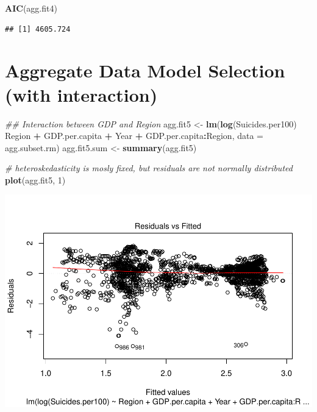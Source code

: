 \documentclass[11pt,]{article}
\newenvironment{Shaded}{\begin{snugshade}}{\end{snugshade}}
\newcommand{\CommentTok}[1]{\textcolor[rgb]{0.56,0.35,0.01}{\textit{#1}}}
\newcommand{\DataTypeTok}[1]{\textcolor[rgb]{0.13,0.29,0.53}{#1}}
\newcommand{\DecValTok}[1]{\textcolor[rgb]{0.00,0.00,0.81}{#1}}
\newcommand{\KeywordTok}[1]{\textcolor[rgb]{0.13,0.29,0.53}{\textbf{#1}}}
\newcommand{\NormalTok}[1]{#1}
\newcommand{\OperatorTok}[1]{\textcolor[rgb]{0.81,0.36,0.00}{\textbf{#1}}}
\newcommand{\StringTok}[1]{\textcolor[rgb]{0.31,0.60,0.02}{#1}}
\begin{document}
\begin{Shaded}
\begin{Highlighting}[]
\KeywordTok{AIC}\NormalTok{(agg.fit4)}
\end{Highlighting}
\end{Shaded}

\begin{verbatim}
## [1] 4605.724
\end{verbatim}

\hypertarget{aggregate-data-model-selection-with-interaction}{%
\section{Aggregate Data Model Selection (with
interaction)}\label{aggregate-data-model-selection-with-interaction}}

\begin{Shaded}
\begin{Highlighting}[]
\CommentTok{## Interaction between GDP and Region}
\NormalTok{agg.fit5 <-}\StringTok{ }\KeywordTok{lm}\NormalTok{(}\KeywordTok{log}\NormalTok{(Suicides.per100) }\OperatorTok{~}\StringTok{ }\NormalTok{Region }\OperatorTok{+}\StringTok{ }\NormalTok{GDP.per.capita }\OperatorTok{+}\StringTok{ }\NormalTok{Year }\OperatorTok{+}\StringTok{ }\NormalTok{GDP.per.capita}\OperatorTok{:}\NormalTok{Region, }\DataTypeTok{data =}\NormalTok{ agg.subset.rm)}
\NormalTok{agg.fit5.sum <-}\StringTok{ }\KeywordTok{summary}\NormalTok{(agg.fit5)}

\CommentTok{# heteroskedasticity is mosly fixed, but residuals are not normally distributed}
\KeywordTok{plot}\NormalTok{(agg.fit5, }\DecValTok{1}\NormalTok{)}
\end{Highlighting}
\end{Shaded}

\includegraphics{An-Analysis-of-Suicide-Data_files/figure-latex/unnamed-chunk-9-1.pdf}
\end{document}
